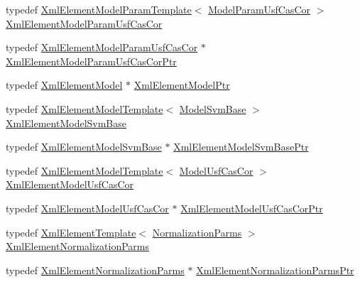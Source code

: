 \begin{DoxyCompactItemize}
\item 
typedef \hyperlink{class_k_k_m_l_l_1_1_xml_element_model_param_template}{Xml\+Element\+Model\+Param\+Template}$<$ \hyperlink{class_k_k_m_l_l_1_1_model_param_usf_cas_cor}{Model\+Param\+Usf\+Cas\+Cor} $>$ \hyperlink{namespace_k_k_m_l_l_af9dabd65f5ed6cd055ba48c7780134b1}{Xml\+Element\+Model\+Param\+Usf\+Cas\+Cor}
\item 
typedef \hyperlink{namespace_k_k_m_l_l_af9dabd65f5ed6cd055ba48c7780134b1}{Xml\+Element\+Model\+Param\+Usf\+Cas\+Cor} $\ast$ \hyperlink{namespace_k_k_m_l_l_a1ce1f9d3d68492696cd353b115e01b34}{Xml\+Element\+Model\+Param\+Usf\+Cas\+Cor\+Ptr}
\item 
typedef \hyperlink{class_k_k_m_l_l_1_1_xml_element_model}{Xml\+Element\+Model} $\ast$ \hyperlink{namespace_k_k_m_l_l_afb9453cdd3686eead5b3d43219c76528}{Xml\+Element\+Model\+Ptr}
\item 
typedef \hyperlink{class_k_k_m_l_l_1_1_xml_element_model_template}{Xml\+Element\+Model\+Template}$<$ \hyperlink{class_k_k_m_l_l_1_1_model_svm_base}{Model\+Svm\+Base} $>$ \hyperlink{namespace_k_k_m_l_l_a2bebbf479e12513fc49210862bd87d22}{Xml\+Element\+Model\+Svm\+Base}
\item 
typedef \hyperlink{namespace_k_k_m_l_l_a2bebbf479e12513fc49210862bd87d22}{Xml\+Element\+Model\+Svm\+Base} $\ast$ \hyperlink{namespace_k_k_m_l_l_aded013be093ad730f02dff68389f923a}{Xml\+Element\+Model\+Svm\+Base\+Ptr}
\item 
typedef \hyperlink{class_k_k_m_l_l_1_1_xml_element_model_template}{Xml\+Element\+Model\+Template}$<$ \hyperlink{class_k_k_m_l_l_1_1_model_usf_cas_cor}{Model\+Usf\+Cas\+Cor} $>$ \hyperlink{namespace_k_k_m_l_l_aec7e6afb46ad7bf004a01e681f738bf6}{Xml\+Element\+Model\+Usf\+Cas\+Cor}
\item 
typedef \hyperlink{namespace_k_k_m_l_l_aec7e6afb46ad7bf004a01e681f738bf6}{Xml\+Element\+Model\+Usf\+Cas\+Cor} $\ast$ \hyperlink{namespace_k_k_m_l_l_a38483eb9f1d416374bb489ca2488aa77}{Xml\+Element\+Model\+Usf\+Cas\+Cor\+Ptr}
\item 
typedef \hyperlink{class_k_k_b_1_1_xml_element_template}{Xml\+Element\+Template}$<$ \hyperlink{class_k_k_m_l_l_1_1_normalization_parms}{Normalization\+Parms} $>$ \hyperlink{namespace_k_k_m_l_l_a80999ab5f8f5e6283564544d2ce63d92}{Xml\+Element\+Normalization\+Parms}
\item 
typedef \hyperlink{namespace_k_k_m_l_l_a80999ab5f8f5e6283564544d2ce63d92}{Xml\+Element\+Normalization\+Parms} $\ast$ \hyperlink{namespace_k_k_m_l_l_abda3dc3436d2a426342612e38b3204a7}{Xml\+Element\+Normalization\+Parms\+Ptr}

\end{DoxyCompactItemize}
